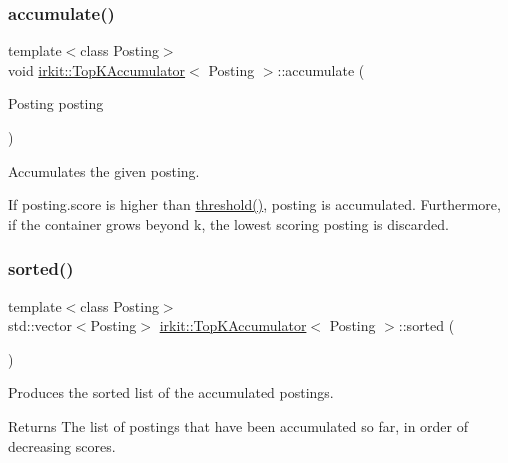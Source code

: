 \subsubsection{\texorpdfstring{accumulate()}{accumulate()}}
{\footnotesize\ttfamily template$<$class Posting$>$ \\
void \mbox{\hyperlink{classirkit_1_1TopKAccumulator}{irkit\+::\+Top\+K\+Accumulator}}$<$ Posting $>$\+::accumulate (\begin{DoxyParamCaption}\item[{Posting}]{posting }\end{DoxyParamCaption})\hspace{0.3cm}{\ttfamily [inline]}}



Accumulates the given posting. 

If {\ttfamily posting.\+score} is higher than \mbox{\hyperlink{classirkit_1_1TopKAccumulator_abe812895292f04ad6cdcebe3f0864d30}{threshold()}}, {\ttfamily posting} is accumulated. Furthermore, if the container grows beyond {\ttfamily k}, the lowest scoring posting is discarded. \mbox{\label{classirkit_1_1TopKAccumulator_adde0cfe7ba7dc26ca2cc55422b2351fa}} 
\subsubsection{\texorpdfstring{sorted()}{sorted()}}
{\footnotesize\ttfamily template$<$class Posting$>$ \\
std\+::vector$<$Posting$>$ \mbox{\hyperlink{classirkit_1_1TopKAccumulator}{irkit\+::\+Top\+K\+Accumulator}}$<$ Posting $>$\+::sorted (\begin{DoxyParamCaption}{ }\end{DoxyParamCaption})\hspace{0.3cm}{\ttfamily [inline]}}



Produces the sorted list of the accumulated postings. 

\begin{DoxyReturn}{Returns}
The list of postings that have been accumulated so far, in order of decreasing scores. 
\end{DoxyReturn}
\mbox{\label{classirkit_1_1TopKAccumulator_abe812895292f04ad6cdcebe3f0864d30}} 
